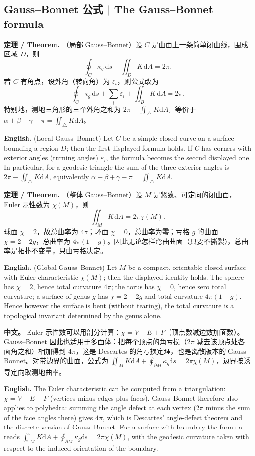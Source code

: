 \documentclass[UTF8,11pt,a4paper]{ctexart}
\newcommand{\APS}[2]{\par\noindent\textbf{中文。} #1\par\noindent\textbf{English.} #2\par\smallskip}
\newcommand{\EN}[1]{\par\noindent \textbf{English.} #1\par}
\newcommand{\THM}[2]{\par\noindent\textbf{定理 / Theorem.} #1\par\EN{#2}\par\smallskip}
\newcommand{\dd}{\mathrm{d}}
\begin{document}
\subsection{Gauss--Bonnet 公式 | The Gauss--Bonnet formula}
\THM{（局部 Gauss--Bonnet）设 $C$ 是曲面上一条简单闭曲线，围成区域 $D$，则
\[
\oint_C\kappa_g\,\dd s+\iint_DK\,\dd A=2\pi .
\]
若 $C$ 有角点，设外角（转向角）为 $\varepsilon_i$，则公式改为
\[
\oint_C\kappa_g\,\dd s+\sum_i\varepsilon_i+\iint_DK\,\dd A=2\pi .
\]
特别地，测地三角形的三个外角之和为 $2\pi-\iint_\triangle K\dd A$，等价于 $\alpha+\beta+\gamma-\pi=\iint_\triangle K\dd A$。}{(Local Gauss--Bonnet) Let $C$ be a simple closed curve on a surface bounding a region $D$; then the first displayed formula holds. If $C$ has corners with exterior angles (turning angles) $\varepsilon_i$, the formula becomes the second displayed one. In particular, for a geodesic triangle the sum of the three exterior angles is $2\pi-\iint_\triangle K\dd A$, equivalently $\alpha+\beta+\gamma-\pi=\iint_\triangle K\dd A$.}
\THM{（整体 Gauss--Bonnet）设 $M$ 是紧致、可定向的闭曲面，Euler 示性数为 $\chi(M)$，则
\[
\iint_MK\,\dd A=2\pi\chi(M).
\]
球面 $\chi=2$，故总曲率为 $4\pi$；环面 $\chi=0$，总曲率为零；亏格 $g$ 的曲面 $\chi=2-2g$，总曲率为 $4\pi(1-g)$。因此无论怎样弯曲曲面（只要不撕裂），总曲率是拓扑不变量，只由亏格决定。}{(Global Gauss--Bonnet) Let $M$ be a compact, orientable closed surface with Euler characteristic $\chi(M)$; then the displayed identity holds. The sphere has $\chi=2$, hence total curvature $4\pi$; the torus has $\chi=0$, hence zero total curvature; a surface of genus $g$ has $\chi=2-2g$ and total curvature $4\pi(1-g)$. Hence however the surface is bent (without tearing), the total curvature is a topological invariant determined by the genus alone.}
\APS{Euler 示性数可以用剖分计算：$\chi=V-E+F$（顶点数减边数加面数）。Gauss--Bonnet 因此也适用于多面体：把每个顶点的角亏损（$2\pi$ 减去该顶点处各面角之和）相加得到 $4\pi$，这是 Descartes 的角亏损定理，也是离散版本的 Gauss--Bonnet。对带边界的曲面，公式为 $\iint_MK\dd A+\oint_{\partial M}\kappa_g\dd s=2\pi\chi(M)$，边界按诱导定向取测地曲率。}{The Euler characteristic can be computed from a triangulation: $\chi=V-E+F$ (vertices minus edges plus faces). Gauss--Bonnet therefore also applies to polyhedra: summing the angle defect at each vertex ($2\pi$ minus the sum of the face angles there) gives $4\pi$, which is Descartes' angle-defect theorem and the discrete version of Gauss--Bonnet. For a surface with boundary the formula reads $\iint_MK\dd A+\oint_{\partial M}\kappa_g\dd s=2\pi\chi(M)$, with the geodesic curvature taken with respect to the induced orientation of the boundary.}
\end{document}
